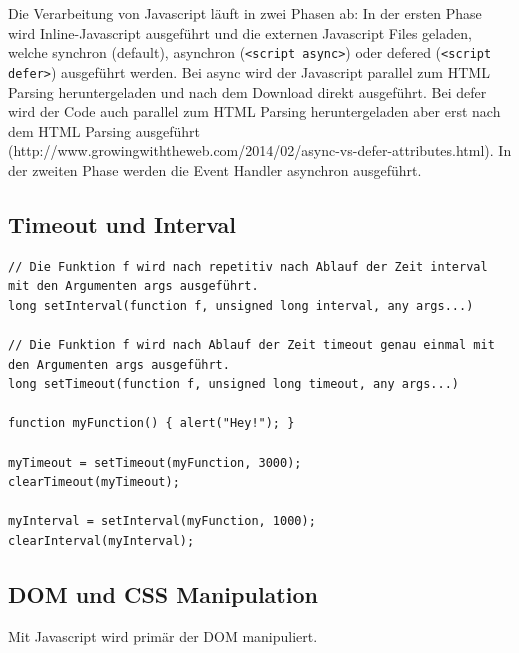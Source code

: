 Die Verarbeitung von Javascript läuft in zwei Phasen ab: In der ersten Phase wird Inline-Javascript ausgeführt und die externen Javascript Files geladen, welche synchron (default), asynchron (\lstinline|<script async>|) oder defered (\lstinline|<script defer>|) ausgeführt werden. Bei async wird der Javascript parallel zum HTML Parsing heruntergeladen und nach dem Download direkt ausgeführt. Bei defer wird der Code auch parallel zum HTML Parsing heruntergeladen aber erst nach dem HTML Parsing ausgeführt (http://www.growingwiththeweb.com/2014/02/async-vs-defer-attributes.html). In der zweiten Phase werden die Event Handler asynchron ausgeführt. 

\subsection{Timeout und Interval}
\begin{lstlisting}[label=lst:timeout-interval,caption=Timeout \& Interval]
// Die Funktion f wird nach repetitiv nach Ablauf der Zeit interval mit den Argumenten args ausgeführt.
long setInterval(function f, unsigned long interval, any args...)

// Die Funktion f wird nach Ablauf der Zeit timeout genau einmal mit den Argumenten args ausgeführt.
long setTimeout(function f, unsigned long timeout, any args...)

function myFunction() { alert("Hey!"); }

myTimeout = setTimeout(myFunction, 3000);
clearTimeout(myTimeout);

myInterval = setInterval(myFunction, 1000);
clearInterval(myInterval);
\end{lstlisting}

\subsection{DOM und CSS Manipulation}
Mit Javascript wird primär der DOM manipuliert. 

